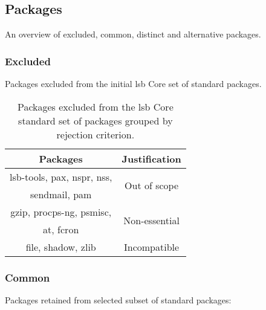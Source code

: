 \subsection{Packages}\label{Packages}

An overview of excluded, common, distinct and alternative packages.

\subsubsection{Excluded}

Packages excluded from the initial \gls{lsb} Core set of standard packages.

\begin{table}[!h]
    \centering
    \begin{tabular}{|c|c|}
        \hline
        Packages & Justification \\
        \hline
        \hline
        lsb-tools\cite{lsb-tools}, pax\cite{pax}, nspr\cite{nspr}, nss\cite{nss}, & \multirow{2}{*}{Out of scope} \\
        sendmail\cite{sendmail}, pam\cite{linux-pam} & \\
        \hline
        gzip\cite{gzip}, procps-ng\cite{procps-ng}, psmisc\cite{psmisc}, & \multirow{2}{*}{Non-essential} \\
        at\cite{at}, fcron\cite{fcron} & \\
        \hline
        file\cite{file}\footnotemark[1], shadow\cite{shadow}\footnotemark[1], zlib\cite{zlib}\footnotemark[2] & Incompatible \\
        \hline
    \end{tabular}
    \caption{Packages excluded from the \gls{lsb} Core standard set of packages grouped by rejection criterion.}
\end{table}


\subsubsection{Common}

Packages retained from selected subset of standard packages:

